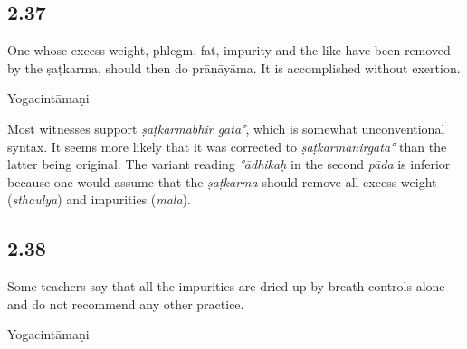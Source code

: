 \begin{ekdosis}
\subsection*{2.37}
\begin{translation}[hp02_037]
One whose excess weight, phlegm, fat, impurity and the like have been removed by the ṣaṭkarma, should then do prāṇāyāma. It is accomplished without exertion.
\end{translation}

\begin{sources}[hp02_037]
\end{sources}

\begin{testimonia}[hp02_037]
Yogacintāmaṇi

\begin{versinnote}
\end{versinnote}
\end{testimonia}

\begin{philcomm}[hp02_037]
Most witnesses support \emph{ṣaṭkarmabhir gata°}, which is somewhat unconventional syntax. It seems more likely that it was corrected to \emph{ṣaṭkarmanirgata°} than the latter being original. The variant reading \emph{°ādhikaḥ} in the second \emph{pāda} is inferior because one would assume that the \emph{ṣaṭkarma} should remove all excess weight (\emph{sthaulya}) and impurities (\emph{mala}). 
\end{philcomm}

\subsection*{2.38}
\begin{translation}[hp02_038]
Some teachers say that all the impurities are dried up by breath-controls alone and do not recommend any other practice.
\end{translation}

\begin{sources}[hp02_038]
\end{sources}

\begin{testimonia}[hp02_038]
Yogacintāmaṇi

\begin{versinnote}
\end{versinnote}
\end{testimonia}


\end{ekdosis}
